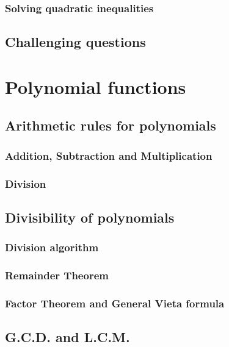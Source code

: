 \documentclass[12pt]{article}
\begin{document}
    \subsubsection{Solving quadratic inequalities}

    \subsection{Challenging questions}

    \newpage 

    \section{Polynomial functions}

    \subsection{Arithmetic rules for polynomials}

    \subsubsection{Addition, Subtraction and Multiplication}

    \subsubsection{Division}

    \subsection{Divisibility of polynomials}

    \subsubsection{Division algorithm}

    \subsubsection{Remainder Theorem}

    \subsubsection{Factor Theorem and General Vieta formula}

    \subsection{G.C.D. and L.C.M.}
\end{document}
